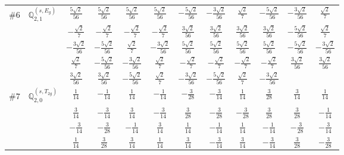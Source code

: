 \documentclass[fleqn,9pt,landscape]{jsarticle}
\begin{document}
\begin{center}
\begin{longtable}{lcccccccccc}
$ \#6\quad \mathbb{Q}_{2,1}^{(s,E_{g})} $ & $ \frac{5 \sqrt{2}}{56} $ & $ \frac{5 \sqrt{2}}{56} $ & $ \frac{5 \sqrt{2}}{56} $ & $ \frac{5 \sqrt{2}}{56} $ & $ - \frac{5 \sqrt{2}}{56} $ & $ - \frac{3 \sqrt{2}}{56} $ & $ \frac{\sqrt{2}}{7} $ & $ - \frac{5 \sqrt{2}}{56} $ & $ - \frac{3 \sqrt{2}}{56} $ & $ \frac{\sqrt{2}}{7} $ \\
& $ - \frac{\sqrt{2}}{7} $ & $ - \frac{\sqrt{2}}{7} $ & $ - \frac{\sqrt{2}}{7} $ & $ - \frac{\sqrt{2}}{7} $ & $ \frac{3 \sqrt{2}}{56} $ & $ \frac{3 \sqrt{2}}{56} $ & $ \frac{3 \sqrt{2}}{56} $ & $ \frac{3 \sqrt{2}}{56} $ & $ - \frac{5 \sqrt{2}}{56} $ & $ \frac{\sqrt{2}}{7} $ \\
& $ - \frac{3 \sqrt{2}}{56} $ & $ - \frac{5 \sqrt{2}}{56} $ & $ \frac{\sqrt{2}}{7} $ & $ - \frac{3 \sqrt{2}}{56} $ & $ \frac{5 \sqrt{2}}{56} $ & $ \frac{5 \sqrt{2}}{56} $ & $ \frac{5 \sqrt{2}}{56} $ & $ \frac{5 \sqrt{2}}{56} $ & $ - \frac{5 \sqrt{2}}{56} $ & $ - \frac{3 \sqrt{2}}{56} $ \\
& $ \frac{\sqrt{2}}{7} $ & $ - \frac{5 \sqrt{2}}{56} $ & $ - \frac{3 \sqrt{2}}{56} $ & $ \frac{\sqrt{2}}{7} $ & $ - \frac{\sqrt{2}}{7} $ & $ - \frac{\sqrt{2}}{7} $ & $ - \frac{\sqrt{2}}{7} $ & $ - \frac{\sqrt{2}}{7} $ & $ \frac{3 \sqrt{2}}{56} $ & $ \frac{3 \sqrt{2}}{56} $ \\
& $ \frac{3 \sqrt{2}}{56} $ & $ \frac{3 \sqrt{2}}{56} $ & $ - \frac{5 \sqrt{2}}{56} $ & $ \frac{\sqrt{2}}{7} $ & $ - \frac{3 \sqrt{2}}{56} $ & $ - \frac{5 \sqrt{2}}{56} $ & $ \frac{\sqrt{2}}{7} $ & $ - \frac{3 \sqrt{2}}{56} $ & $  $ & $  $ \\ \hline
$ \#7\quad \mathbb{Q}_{2,0}^{(s,T_{2g})} $ & $ \frac{1}{14} $ & $ - \frac{1}{14} $ & $ \frac{1}{14} $ & $ - \frac{1}{14} $ & $ - \frac{3}{28} $ & $ - \frac{3}{14} $ & $ \frac{1}{14} $ & $ \frac{3}{28} $ & $ \frac{3}{14} $ & $ \frac{1}{14} $ \\
& $ \frac{3}{14} $ & $ - \frac{3}{14} $ & $ \frac{3}{14} $ & $ - \frac{3}{14} $ & $ \frac{3}{28} $ & $ - \frac{3}{28} $ & $ - \frac{3}{28} $ & $ \frac{3}{28} $ & $ \frac{3}{28} $ & $ - \frac{1}{14} $ \\
& $ - \frac{3}{14} $ & $ - \frac{3}{28} $ & $ - \frac{1}{14} $ & $ \frac{3}{14} $ & $ \frac{1}{14} $ & $ - \frac{1}{14} $ & $ \frac{1}{14} $ & $ - \frac{1}{14} $ & $ - \frac{3}{28} $ & $ - \frac{3}{14} $ \\
& $ \frac{1}{14} $ & $ \frac{3}{28} $ & $ \frac{3}{14} $ & $ \frac{1}{14} $ & $ \frac{3}{14} $ & $ - \frac{3}{14} $ & $ \frac{3}{14} $ & $ - \frac{3}{14} $ & $ \frac{3}{28} $ & $ - \frac{3}{28} $ \\

\end{longtable}
\end{center}
\end{document}
